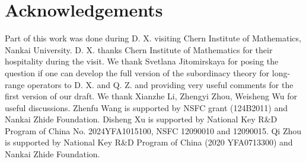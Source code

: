 \documentclass[11pt]{amsart}
\theoremstyle{remark}
\theoremstyle{definition}
\begin{document}
\section*{Acknowledgements} 
 Part of this work was done during D. X. visiting Chern Institute of Mathematics, Nankai University. D.
X. thanks Chern Institute of Mathematics for their hospitality during the visit. We thank Svetlana Jitomirskaya for posing the question if one can develop the full version of the subordinacy theory for long-range operators to D. X. and Q. Z. and providing very useful comments for the first version of our draft. We thank Xianzhe Li, Zhengyi Zhou, Weisheng Wu for useful discussions. Zhenfu Wang is supported by NSFC grant (124B2011) and Nankai Zhide Foundation. Disheng Xu is supported by National Key R\&D Program of China No. 2024YFA1015100, NSFC 12090010 and 12090015. Qi Zhou is supported by National Key R\&D Program of China (2020 YFA0713300) and Nankai Zhide Foundation. 
\end{document}
